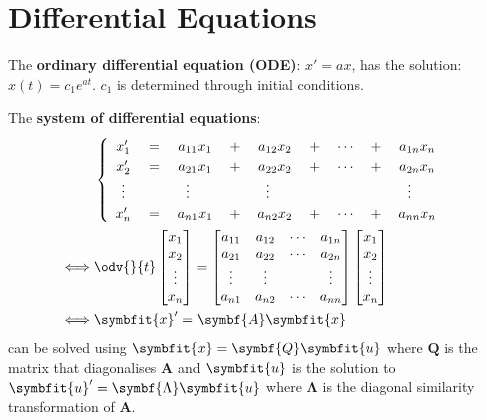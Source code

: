 \documentclass{article}
\begin{document}
\section*{Differential Equations}
The \textbf{ordinary differential equation (ODE)}: \(x' = a x\),
has the solution: \(x(t) = c_1 e^{a t}\). \(c_1\) is determined through
initial conditions.
\begin{multicols*}{2}
    The \textbf{system of differential equations}:
    \begin{align*}
             & \begin{cases}
                   \begin{array}{ c >{{}}c<{{}} c >{{}}c<{{}} c >{{}}c<{{}} c >{{}}c<{{}} c  }
                x'_1               & = & a_{11}x_1                         & + & a_{12}x_2                         & + & \cdots & + & a_{1n}x_n                         \\
                x'_2               & = & a_{21}x_1                         & + & a_{22}x_2                         & + & \cdots & + & a_{2n}x_n                         \\
                \vdotswithin{x'_3} &   & \vdotswithin{a_{31}}\phantom{x_1} &   & \vdotswithin{a_{32}}\phantom{x_2} &   &        &   & \vdotswithin{a_{3n}}\phantom{x_n} \\
                x'_n               & = & a_{n1}x_1                         & + & a_{n2}x_2                         & + & \cdots & + & a_{nn}x_n
            \end{array}
               \end{cases}            \\
        \iff
             & \odv{}{t}
        \begin{bmatrix}
            x_1    \\
            x_2    \\
            \vdots \\
            x_n
        \end{bmatrix} =
        \begin{bmatrix}
            a_{11} & a_{12} & \cdots & a_{1n} \\
            a_{21} & a_{22} & \cdots & a_{2n} \\
            \vdots & \vdots &        & \vdots \\
            a_{n1} & a_{n2} & \cdots & a_{nn}
        \end{bmatrix}
        \begin{bmatrix}
            x_1 \\ x_2 \\ \vdots \\ x_n
        \end{bmatrix}                  \\
        \iff & \symbfit{x}' = \symbf{A} \symbfit{x}
    \end{align*}
    can be solved using \(\symbfit{x}=\symbf{Q}\symbfit{u}\) where
    \(\symbf{Q}\) is the matrix that diagonalises \(\symbf{A}\) and
    \(\symbfit{u}\) is the solution to \(\symbfit{u}' = \symbf{\Lambda} \symbfit{u}\) where
    \(\symbf{\Lambda}\) is the diagonal similarity transformation of \(\symbf{A}\).


\end{multicols*}
\end{document}
